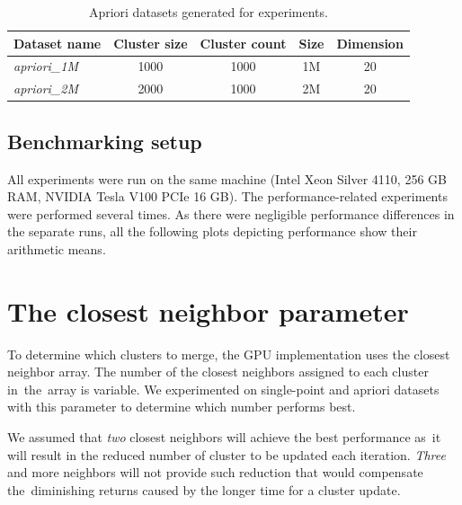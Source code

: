 \begin{description}
	\begin{table}
		\centering
		\begin{tabular}{lcccc}
			\toprule
			\textbf{Dataset name} & \textbf{Cluster size} & \textbf{Cluster count} & \textbf{Size} & \textbf{Dimension} \\ \midrule
			\emph{apriori\_1M}    &         1000          &          1000          &      1M       &         20         \\
			\emph{apriori\_2M}    &         2000          &          1000          &      2M       &         20         \\ \bottomrule
		\end{tabular}
		\caption{Apriori datasets generated for experiments.}
		\label{tab04:apriori}
	\end{table}
	
\end{description}

\subsection{Benchmarking setup}

All experiments were run on the same machine (Intel Xeon Silver 4110, 256 GB RAM, NVIDIA Tesla V100 PCIe 16 GB). The performance-related experiments were performed several times. As there were negligible performance differences in the separate runs, all the following plots depicting performance show their arithmetic means. 

\section{The closest neighbor parameter}

To determine which clusters to merge, the GPU implementation uses the closest neighbor array. The number of the closest neighbors assigned to each cluster in~the~array is variable. We experimented on single-point and apriori datasets with this parameter to determine which number performs best. 

We assumed that \emph{two} closest neighbors will achieve the best performance as~it will result in the reduced number of cluster to be updated each iteration. \emph{Three} and more neighbors will not provide such reduction that would compensate the~diminishing returns caused by the longer time for a cluster update.

